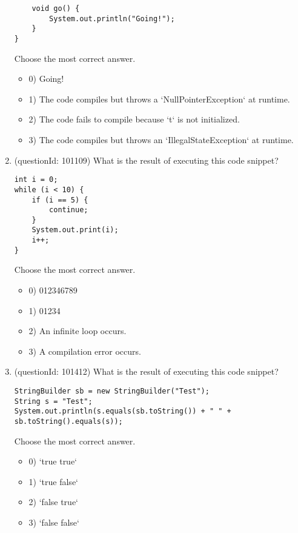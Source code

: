 \documentclass[12pt]{article}
\begin{document}
\begin{enumerate}[label=(\arabic*)]
\begin{verbatim}
    void go() {
        System.out.println("Going!");
    }
}
\end{verbatim}
Choose the most correct answer. 
\begin{itemize}
\item 0) Going!

\item 1) The code compiles but throws a `NullPointerException` at runtime.

\item 2) The code fails to compile because `t` is not initialized.

\item 3) The code compiles but throws an `IllegalStateException` at runtime.

\end{itemize}
\item (questionId: 101109) What is the result of executing this code snippet?\n\begin{verbatim}
int i = 0;
while (i < 10) {
    if (i == 5) {
        continue;
    }
    System.out.print(i);
    i++;
}
\end{verbatim}
Choose the most correct answer. 
\begin{itemize}
\item 0) 012346789

\item 1) 01234

\item 2) An infinite loop occurs.

\item 3) A compilation error occurs.

\end{itemize}
\item (questionId: 101412) What is the result of executing this code snippet?
\begin{verbatim}
StringBuilder sb = new StringBuilder("Test");
String s = "Test";
System.out.println(s.equals(sb.toString()) + " " + sb.toString().equals(s));
\end{verbatim}
Choose the most correct answer. 
\begin{itemize}
\item 0) `true true`

\item 1) `true false`

\item 2) `false true`

\item 3) `false false`


\end{itemize}
\end{enumerate}
\end{document}

